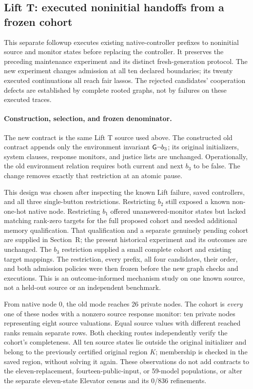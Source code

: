 \subsection*{Lift T: executed noninitial handoffs from a frozen cohort}
\label{supp:noninitial-handoff}
This separate followup executes existing native-controller prefixes to
noninitial source and monitor states before replacing the controller.
It preserves the preceding maintenance experiment and its distinct
fresh-generation protocol. The new experiment changes admission at all
ten declared boundaries; its twenty executed continuations all reach
fair lassos. The rejected candidates' cooperation defects are established
by complete rooted graphs, not by failures on these executed traces.


\paragraph{Construction, selection, and frozen denominator.}
The new contract is the same Lift T source used above. The constructed
old contract appends only the environment invariant $\mathsf{G}\neg b_3$;
its original initializers, system clauses, response monitors, and justice
lists are unchanged. Operationally, the old environment relation requires
both current and next $b_3$ to be false. The change removes exactly that
restriction at an atomic pause.

This design was chosen after inspecting the known Lift failure, saved
controllers, and all three single-button restrictions. Restricting $b_2$
still exposed a known non-one-hot native node. Restricting $b_1$ offered
unanswered-monitor states but lacked matching rank-zero targets for the
full proposed cohort and needed additional memory qualification.
That qualification and a separate genuinely pending cohort are supplied
in Section~R; the present historical experiment and its outcomes are unchanged.
The $b_3$ restriction supplied a small complete cohort and existing target
mappings. The restriction, every prefix, all four candidates, their order,
and both admission policies were then frozen before the new graph checks
and executions. This is an outcome-informed mechanism study on one known
source, not a held-out source or an independent benchmark.

From native node 0, the old mode reaches 26 private nodes. The cohort is
\emph{every} one of these nodes with a nonzero source response monitor:
ten private nodes representing eight source valuations. Equal source
values with different reached ranks remain separate rows. Both checking
routes independently verify the cohort's completeness. All ten source
states lie outside the original initializer and belong to the previously
certified original region $K$; membership is checked in the saved region,
without solving it again. These observations do not add contracts to the
eleven-replacement, fourteen-public-input, or 59-model populations, or
alter the separate eleven-state Elevator census and its 0/836 refinements.

